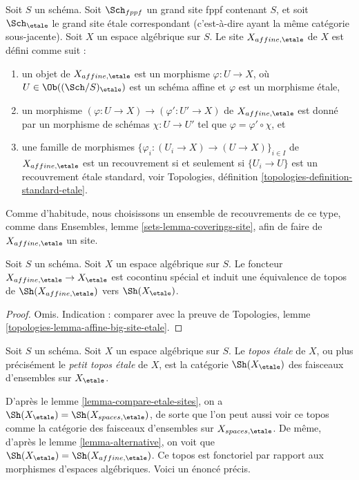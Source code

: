 \begin{definition}
\label{definition-affine-etale-site}
Soit $S$ un schéma.
Soit $\Sch_{fppf}$ un grand site fppf contenant $S$,
et soit $\Sch_\etale$ le grand site \'etale correspondant
(c'est-à-dire ayant la même catégorie sous-jacente).
Soit $X$ un espace algébrique sur $S$.
Le site {\it $X_{affine, \etale}$} de $X$ est défini comme suit :
\begin{enumerate}
\item un objet de $X_{affine, \etale}$ est un morphisme
$\varphi : U \to X$, où $U \in \Ob((\Sch/S)_\etale)$ est un schéma affine et
$\varphi$ est un morphisme \'etale,
\item un morphisme $(\varphi : U \to X) \to (\varphi' : U' \to X)$ de
$X_{affine, \etale}$ est donné par un morphisme de schémas
$\chi : U \to U'$ tel que $\varphi = \varphi' \circ \chi$, et
\item une famille de morphismes
$\{\varphi_i : (U_i \to X) \to (U \to X)\}_{i \in I}$
de $X_{affine, \etale}$ est un recouvrement si et seulement si
$\{U_i \to U\}$ est un recouvrement \'etale standard, voir
Topologies, définition \ref{topologies-definition-standard-etale}.
\end{enumerate}
Comme d'habitude, nous choisissons un ensemble de recouvrements de ce type, comme dans
Ensembles, lemme \ref{sets-lemma-coverings-site},
afin de faire de $X_{affine, \etale}$ un site.
\end{definition}

\begin{lemma}
\label{lemma-alternative}
Soit $S$ un schéma. Soit $X$ un espace algébrique sur $S$.
Le foncteur $X_{affine, \etale} \to X_\etale$
est cocontinu spécial et induit une équivalence de topos de
$\Sh(X_{affine, \etale})$ vers $\Sh(X_\etale)$.
\end{lemma}

\begin{proof}
Omis. Indication : comparer avec la preuve de
Topologies, lemme \ref{topologies-lemma-affine-big-site-etale}.
\end{proof}

\begin{definition}
\label{definition-etale-topos}
Soit $S$ un schéma. Soit $X$ un espace algébrique sur $S$.
Le {\it topos \'etale} de $X$, ou plus précisément le
{\it petit topos \'etale} de $X$, est la catégorie
$\Sh(X_\etale)$
des faisceaux d'ensembles sur $X_\etale$.
\end{definition}

\noindent
D'après le
lemme \ref{lemma-compare-etale-sites},
on a
$\Sh(X_\etale) = \Sh(X_{spaces, \etale})$,
de sorte que l'on peut aussi voir ce topos comme la catégorie des faisceaux d'ensembles sur
$X_{spaces, \etale}$. De même, d'après le
lemme \ref{lemma-alternative},
on voit que
$\Sh(X_\etale) = \Sh(X_{affine, \etale})$.
Ce topos est fonctoriel par rapport aux morphismes
d'espaces algébriques. Voici un énoncé précis.

